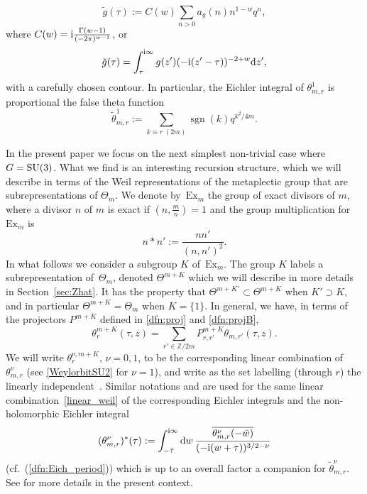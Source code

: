 \documentclass[10pt,a4paper]{amsart}
\def\ri{\mathrm{i}}
\def\BZ{\mathbb{Z}}
\newcommand{\ZZ}{\mathbb{Z}}
\theoremstyle{definition}
\numberwithin{equation}{section}
\begin{document}
\begin{equation}\label{dfn:Eichler_integral}
 \tilde g(\tau) := C(w)\sum_{n>0}a_g(n)n^{1-w} q^n,
\end{equation}
where $C(w)={\rm i}\frac{\Gamma(w-1)}{(-2\pi)^{w-1}}$, or
\[
 \tilde g(\tau) = \int_{\tau}^{{\rm i}\infty} g(z')(-{\rm i}(z'-\tau))^{-2+w} {\rm d}z',
\]
with a carefully chosen contour. In particular, the Eichler integral of $\theta^1_{m,r}$ is proportional the false theta function
\[
 \tilde\theta^1_{m,r}:= \sum_{k\equiv r~(2m)}
 \operatorname{sgn}(k)q^{k^2/4m}.
\]


In the present paper we focus on the next simplest non-trivial case where $G={\rm SU}(3)$. What we find is an interesting recursion structure, which we will describe in terms of the Weil representations of the metaplectic group \smash{$\widetilde{{\rm SL}_2(\BZ)}$} that are subrepresentations of $\Theta_m$. We denote by~$\mathrm{Ex}_m$ the group of exact divisors of $m$, where a divisor $n$ of $m$ is exact if $\left(n,\frac{m}{n}\right)=1$ and the group multiplication for $\mathrm{Ex}_m$ is
\[n\ast n':=\frac{nn'}{(n,n')^2}.\] In what follows we consider a subgroup $K$ of~$\mathrm{Ex}_m$. The group $K$ labels a subrepresentation of~$\Theta_m$, denoted $\Theta^{m+K}$ which we will describe in more details in Section~\ref{sec:Zhat}. It has the property that $\Theta^{m+K'}\subset \Theta^{m+K} $ when $K'\supset K$, and in particular $\Theta^{m+K}=\Theta_m$ when $K=\{1\}$. In general, we have, in terms of the projectors $P^{m+K}$ defined in \eqref{dfn:proj} and \eqref{dfn:projB},
\begin{equation}\label{linear_weil}
 \theta^{m+K}_{r}(\tau,z) = \sum_{r'\in \ZZ/2m} P_{r,r'}^{m+K} \theta_{m,r'}(\tau,z).
\end{equation}
We will write $\theta^{\nu,m+K}_{r}$, $\nu=0,1$, to be the corresponding linear combination of $\theta^{\nu}_{m,r}$ (see \eqref{WeylorbitSU2} for $\nu=1$), and write \smash{$\sigma^{m+K}\subset \ZZ/2m$} as the set labelling (through $r$) the linearly independent~. Similar notations  and  are used for the same linear combination~\eqref{linear_weil} of the corresponding Eichler integrals and the non-holomorphic Eichler integral
 \[
 ({\theta^\nu_{m,r}})^\ast(\tau) :=
 \int_{-\bar{\tau} }^{{\rm i}\infty} {\rm d}w \,
\frac{\overline{\theta^\nu_{m,r}(-\bar w)}}{(-\ri(w+\tau))^{3/2-\nu}}
 \]
 (cf.\ (\ref{dfn:Eich_period})) which is up to an overall factor a companion for $ \tilde\theta^\nu_{m,r}$. See \cite[Section~7.3]{cheng20193d} for more details in the present context.
\end{document}
